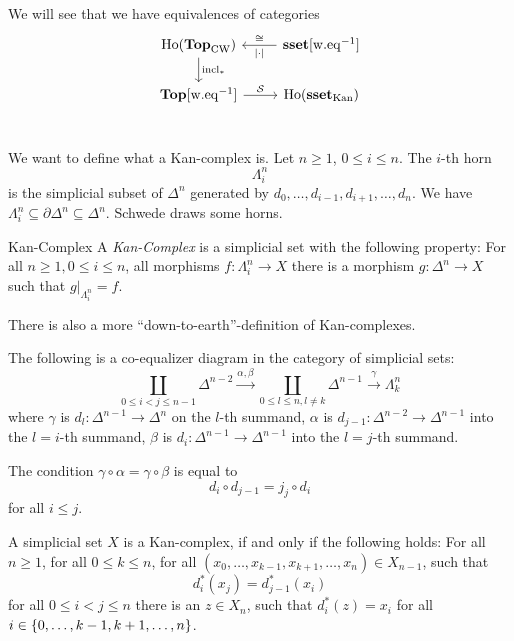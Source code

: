 \documentclass[language=english]{TemplateLecture}
\begin{document}
We will see that we have equivalences of categories
\[\begin{tikzcd}
    \Ho(\topc_{\mathrm{CW}}) \ar[d, "\incl_*"] & \sset\weq\ar[l, "\abs\cdot", "\cong"'] \\
    \topc\weq \ar[r, "\cS"] & \Ho(\sset_{\mathrm{Kan}}) \\
\end{tikzcd}\]

We want to define what a Kan-complex is. Let \(n\geq 1\), \(0\leq i\leq n\). The \(i\)-th horn
\[\Lambda_i^n\]
is the simplicial subset of \(\Delta^n\) generated by \(d_0, \dots, d_{i-1}, d_{i+1},\dots, d_n\). We have \(\Lambda_i^n \subseteq \partial\Delta^n \subseteq \Delta^n\). Schwede draws some horns. 

\begin{defi}{Kan-Complex}{}
    A \emph{Kan-Complex} is a simplicial set with the following property: For all \(n\geq 1, 0 \leq i\leq n\), all morphisms \(f\colon \Lambda_i^n\to X\) there is a morphism \(g\colon \Delta^n\to X\) such that \(g \rvert_{\Lambda_i^n} = f\).
\end{defi}

There is also a more \enquote{down-to-earth}-definition of Kan-complexes.

\begin{proposition}
    The following is a co-equalizer diagram in the category of simplicial sets:
    \[\coprod_{0\leq i < j\leq n-1}\Delta^{n-2} \xrightarrow{\alpha,\beta}\coprod_{0\leq l\leq n, l\neq k} \Delta^{n-1} \xrightarrow{\gamma}\Lambda_k^n\]
    where \(\gamma\) is \(d_l\colon \Delta^{n-1} \to \Delta^n\) on the \(l\)-th summand, \(\alpha\) is \(d_{j-1}\colon \Delta^{n-2}\to \Delta^{n-1}\) into the \(l = i\)-th summand, \(\beta\) is \(d_i \colon \Delta^{n-1}\to \Delta^{n-1}\) into the \(l = j\)-th summand.
    
    The condition \(\gamma\circ \alpha = \gamma\circ \beta\) is equal to
    \[d_i \circ d_{j-1} = j_j \circ d_i\]
    for all \(i \leq j\).
\end{proposition}

\begin{corollary}
    A simplicial set \(X\) is a Kan-complex, if and only if the following holds:
    For all \(n \geq 1\), for all \(0\leq k \leq n\), for all \((x_0, \dots, x_{k-1}, x_{k+1}, \dots, x_n) \in X_{n-1}\), such that
    \[d_i^*(x_j) = d_{j-1}^*(x_i)\]
    for all \(0 \leq i < j \leq n\) there is an \(z \in X_n\), such that \(d_i^*(z) = x_i\) for all \(i \in \{0, \dots, k-1, k+1, \dots, n\}\).
\end{corollary}
\end{document}
